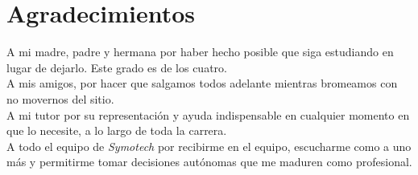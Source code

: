 \chapter*{Agradecimientos}

A mi madre, padre y hermana por haber hecho posible que siga estudiando en lugar de dejarlo. Este grado es de los cuatro.\\

A mis amigos, por hacer que salgamos todos adelante mientras bromeamos con no movernos del sitio.\\

A mi tutor por su representación y ayuda indispensable en cualquier momento en que lo necesite, a lo largo de toda la carrera.\\

A todo el equipo de \textit{Symotech} por recibirme en el equipo, escucharme como a uno más y permitirme tomar decisiones autónomas que me maduren como profesional.\\